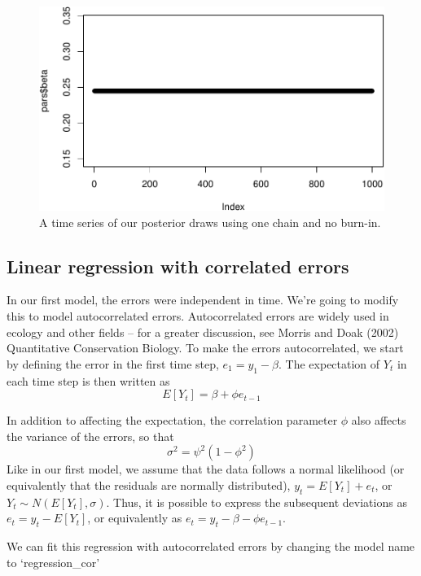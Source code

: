 \documentclass[
]{article}
\begin{document}
\begin{figure}

{\centering \includegraphics[width=0.8\linewidth]{fitting-models-with-stan_files/figure-latex/stan-fig-burnin-1} 

}

\caption{A time series of our posterior draws using one chain and no burn-in.}\label{fig:stan-fig-burnin}
\end{figure}

\hypertarget{sec-stan-lr-ar}{%
\subsection{Linear regression with correlated
errors}\label{sec-stan-lr-ar}}

In our first model, the errors were independent in time. We're going to
modify this to model autocorrelated errors. Autocorrelated errors are
widely used in ecology and other fields -- for a greater discussion, see
Morris and Doak (2002) Quantitative Conservation Biology. To make the
errors autocorrelated, we start by defining the error in the first time
step, \({e}_{1} = y_{1} - \beta\). The expectation of \({Y_t}\) in each
time step is then written as \[E[{Y_t}] = \beta + \phi  e_{t-1}\]

In addition to affecting the expectation, the correlation parameter
\(\phi\) also affects the variance of the errors, so that
\[{ \sigma  }^{ 2 }={ \psi  }^{ 2 }\left( 1-{ \phi  }^{ 2 } \right)\]
Like in our first model, we assume that the data follows a normal
likelihood (or equivalently that the residuals are normally
distributed), \(y_t = E[Y_t] + e_t\), or
\(Y_t \sim N(E[{Y_t}], \sigma)\). Thus, it is possible to express the
subsequent deviations as \({e}_{t} = {y}_{t} - E[{Y_t}]\), or
equivalently as \({e}_{t} = {y}_{t} - \beta -\phi {e}_{t-1}\).

We can fit this regression with autocorrelated errors by changing the
model name to `regression\_cor'
\end{document}
